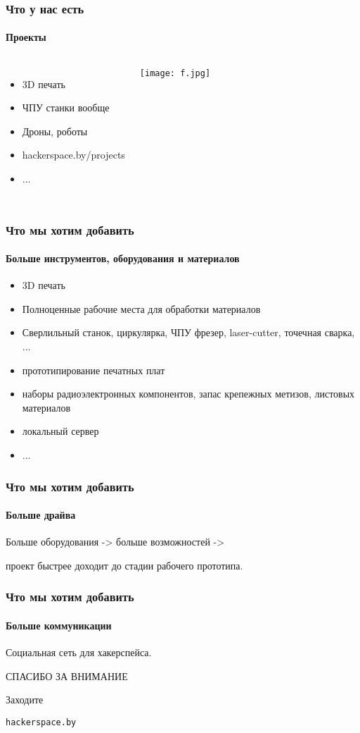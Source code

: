 \documentclass{beamer}
\begin{document}
\begin {frame}
\frametitle {Что у нас есть}
\framesubtitle {Проекты}
\begin{columns}
\begin{itemize}
\item 3D печать
\item ЧПУ станки вообще
\item Дроны, роботы
\item hackerspace.by/projects
\item ...
\end{itemize}
  \texttt{[image: f.jpg]}
\end{columns}
\end {frame}


\begin {frame}
\frametitle {Что мы хотим добавить}
\framesubtitle {Больше инструментов, оборудования и материалов}
\begin{itemize}
\item 3D печать
\item Полноценные рабочие места для обработки материалов
\item Сверлильный станок, циркулярка, ЧПУ фрезер, laser-cutter, точечная сварка, ...
\item прототипирование печатных плат
\item наборы радиоэлектронных компонентов, запас крепежных метизов, листовых материалов
\item локальный сервер
\item ...
\end{itemize}
\end {frame}


\begin {frame}
\frametitle {Что мы хотим добавить}
\framesubtitle {Больше драйва}
Больше оборудования -> больше возможностей -> 

проект быстрее доходит до стадии рабочего прототипа.
\end {frame}


\begin {frame}
\frametitle {Что мы хотим добавить}
\framesubtitle {Больше коммуникации}
Социальная сеть для хакерспейса.
\end {frame}


\begin {frame}
\begin{center}
СПАСИБО ЗА ВНИМАНИЕ

Заходите

\texttt{hackerspace.by}
\end{center}
\end {frame}
\end{document}
